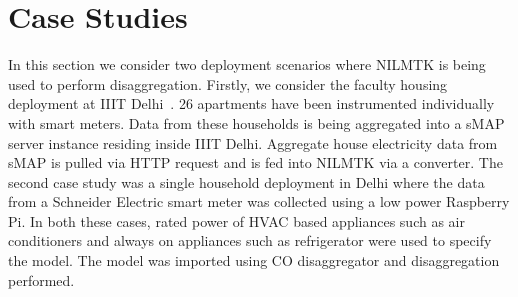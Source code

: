 \documentclass{sig-alternate}
\begin{document}

{\scriptsize
}

\newpage
\appendix
\section{Case Studies}
\label{sec:use_case}

\noindent
In this section we consider two deployment scenarios where NILMTK is being used to perform disaggregation. Firstly, we consider the faculty housing deployment at IIIT Delhi~\cite{batra_2012}. 26 apartments have been instrumented individually with smart meters. Data from these households is being aggregated into a sMAP~\cite{smap} server instance residing inside IIIT Delhi. Aggregate house electricity data from sMAP is pulled via HTTP request and is fed into NILMTK via a converter. The second case study was a single household deployment in Delhi where the data from a Schneider Electric smart meter was collected using a low power Raspberry Pi. In both these cases, rated power of HVAC based appliances such as air conditioners and always on appliances such as refrigerator were used to specify the model. The model was imported using CO disaggregator and disaggregation performed.
\end{document}
